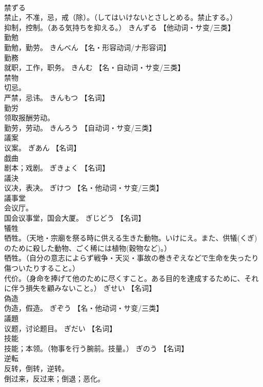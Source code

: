 \documentclass[8pt]{extreport}
\begin{document}
\begin{CJK}{UTF8}{min}
\\	禁ずる	
\\	禁止，不准，忌，戒（除）。（してはいけないとさしとめる。禁止する。） 
\\	抑制，控制。（ある気持ちを抑える。）	きんずる		【他动词・サ变/三类】
\\	勤勉	
\\	勤勉，勤劳。	きんべん		【名・形容动词/ナ形容词】
\\	勤務	
\\	就职，工作，职务。	きんむ		【名・自动词・サ变/三类】
\\	禁物	
\\	切忌。 
\\	严禁，忌讳。	きんもつ		【名词】
\\	勤労	
\\	领取报酬劳动。 
\\	勤劳，劳动。	きんろう		【自动词・サ变/三类】
\\	議案	
\\	议案。	ぎあん		【名词】
\\	戯曲	
\\	剧本；戏剧。	ぎきょく		【名词】
\\	議決	
\\	议决，表决。	ぎけつ		【名・他动词・サ变/三类】
\\	議事堂	
\\	会议厅。 
\\	国会议事堂，国会大厦。	ぎじどう		【名词】
\\	犠牲	
\\	牺牲。（天地・宗廟を祭る時に供える生きた動物。いけにえ。また、供犠(くぎ)のために殺した動物、ごく稀には植物(穀物など)。） 
\\	牺牲。（自分の意志によらず戦争・天災・事故の巻きぞえなどで生命を失ったり傷ついたりすること。） 
\\	代价。（身命を捧げて他のために尽くすこと。ある目的を達成するために、それに伴う損失を顧みないこと。）	ぎせい		【名词】
\\	偽造	
\\	伪造，假造。	ぎぞう		【名・他动词・サ变/三类】
\\	議題	
\\	议题，讨论题目。	ぎだい		【名词】
\\	技能	
\\	技能；本领。（物事を行う腕前。技量。）	ぎのう		【名词】
\\	逆転	
\\	反转，倒转，逆转。 
\\	倒过来，反过来；倒退；恶化。 

\end{CJK}
\end{document}
